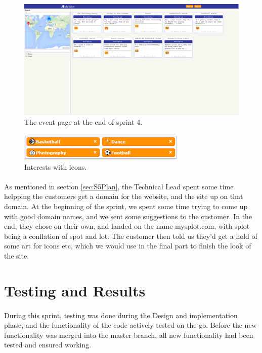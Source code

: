 \begin{figure}[ht!]
  \centering
  \includegraphics[width=\linewidth]{./img/webpage/3Nov/FrontpageEvents}
  \caption{The event page at the end of sprint 4.}
  \label{fig:S5DesignImplFrontEvents3Nov}
\end{figure}

\begin{figure}[ht!]
  \centering
  \includegraphics[width=80mm]{./Sprint5/img/InterestIcons}
  \caption{Interests with icons.}
  \label{fig:S5DesignImplInterestIcons}
\end{figure}

\paragraph{} As mentioned in section \ref{sec:S5Plan}, the Technical Lead spent some time helpping the customers get a domain for the website, and the site up on that domain. At the beginning of the sprint, we spent some time trying to come up with good domain names, and we sent some suggestions to the customer. In the end, they chose on their own, and landed on the name mysplot.com, with splot being a conflation of spot and lot. The customer then told us they'd get a hold of some art for icons etc, which we would use in the final part to finish the look of the site.


\section{Testing and Results}
\label{sec:S5Testing}
\paragraph{} During this sprint, testing was done during the Design and implementation phase, and the functionality of the code actively tested on the go. Before the new functionality was merged into the master branch, all new functionality had been tested and ensured working. 

